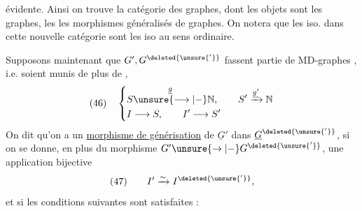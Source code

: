 évidente. Ainsi on trouve la catégorie  des graphes, dont les objets sont les graphes, les  les morphismes généralisés de graphes. On notera que les iso. dans cette nouvelle catégorie sont les iso au sens ordinaire.

Supposons maintenant que $G',G^{\deleted{\unsure{'}}}$ fassent partie de MD-graphes , i.e. soient munis de plus de ,
\[
(46)\quad\left\{\begin{aligned}
&S\overset{\underline g}{\unsure{\longrightarrow|{-}}}\mathbb N,\qquad S'\xrightarrow{\underline{g'}}\mathbb N\\
&I\longrightarrow S,\qquad I'\longrightarrow S'
\end{aligned}\right.
\]
On dit qu'on a un \uline{morphisme de générisation} de $\underline G'$ dans $\underline G^{\deleted{\unsure{'}}}$, si on se donne, en plus du morphisme  $G'\unsure{\to|{-}}G^{\deleted{\unsure{'}}}$, une application bijective
\[
(47)\qquad I'\xrightarrow{\sim}I^{\deleted{\unsure{'}}},
\]
 et si les conditions suivantes sont satisfaites :
